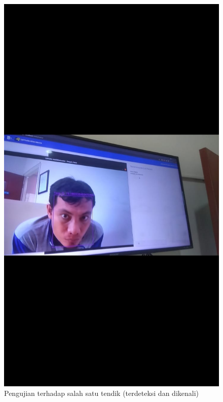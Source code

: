 \begin{figure} [p] \centering
    \includegraphics[scale=0.2]{gambar/masarisdetect0.jpeg}
    \caption{Pengujian terhadap salah satu tendik (terdeteksi dan dikenali)}
    \label{fig:SfMasarisdetect0}
\end{figure}

